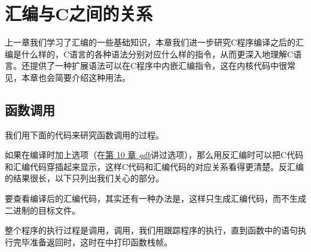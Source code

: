 

\chapter{汇编与C之间的关系}
%
上一章我们学习了汇编的一些基础知识，本章我们进一步研究C程序编译之后的汇编是什么样的，C语言的各种语法分别对应什么样的指令，从而更深入地理解C语言。还提供了一种扩展语法可以在C程序中内嵌汇编指令，这在内核代码中很常见，本章也会简要介绍这种用法。




\section{函数调用}
%
我们用下面的代码来研究函数调用的过程。





如果在编译时加上选项（在\hyperlink{db.ch10.id2740153}{第 10 章 \emph{gdb}}讲过选项），那么用反汇编时可以把C代码和汇编代码穿插起来显示，这样C代码和汇编代码的对应关系看得更清楚。反汇编的结果很长，以下只列出我们关心的部分。




要查看编译后的汇编代码，其实还有一种办法是，这样只生成汇编代码，而不生成二进制的目标文件。



整个程序的执行过程是调用，调用，我们用跟踪程序的执行，直到函数中的语句执行完毕准备返回时，这时在中打印函数栈帧。




